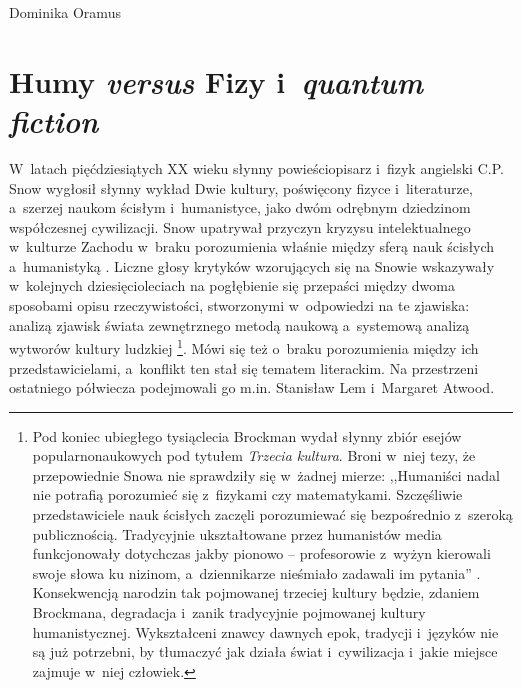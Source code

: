 \begin{artplenv}{Dominika Oramus}
\section*{Humy \textit{versus} Fizy i~\textit{quantum fiction}}
W~latach pięćdziesiątych XX wieku słynny powieściopisarz i~fizyk angielski C.P. Snow wygłosił słynny wykład Dwie kultury, poświęcony fizyce i~literaturze, a~szerzej naukom ścisłym i~humanistyce, jako dwóm odrębnym dziedzinom współczesnej cywilizacji. Snow upatrywał przyczyn kryzysu intelektualnego w~kulturze Zachodu w~braku porozumienia właśnie między sferą nauk ścisłych a~humanistyką
\parencite[][]{snow_dwie_1999}. %
 Liczne głosy krytyków wzorujących się na Snowie wskazywały w~kolejnych dziesięcioleciach na pogłębienie się przepaści między dwoma sposobami opisu rzeczywistości, stworzonymi w~odpowiedzi na te zjawiska: analizą zjawisk świata zewnętrznego metodą naukową a~systemową analizą wytworów kultury ludzkiej 
\parencite[zob. np.][]{weiner_postnaturalizm_2018}%
\footnote{Pod koniec ubiegłego tysiąclecia Brockman wydał słynny zbiór esejów popularnonaukowych pod tytułem \textit{Trzecia kultura}. Broni w~niej tezy, że przepowiednie Snowa nie sprawdziły się w~żadnej mierze: ,,Humaniści nadal nie potrafią porozumieć się z~fizykami czy matematykami. Szczęśliwie przedstawiciele nauk ścisłych zaczęli porozumiewać się bezpośrednio z~szeroką publicznością. Tradycyjnie ukształtowane przez humanistów media funkcjonowały dotychczas jakby pionowo -- profesorowie z~wyżyn kierowali swoje słowa ku nizinom, a~dziennikarze nieśmiało zadawali im pytania'' 
\parencite[][s.~17]{brockman_trzecia_1996}. %
 Konsekwencją narodzin tak pojmowanej trzeciej kultury będzie, zdaniem Brockmana, degradacja i~zanik tradycyjnie pojmowanej kultury humanistycznej. Wykształceni znawcy dawnych epok, tradycji i~języków nie są już potrzebni, by tłumaczyć jak działa świat i~cywilizacja i~jakie miejsce zajmuje w~niej człowiek.}. Mówi się też o~braku porozumienia między ich przedstawicielami, a~konflikt ten stał się tematem literackim. Na przestrzeni ostatniego półwiecza podejmowali go m.in. Stanisław Lem i~Margaret Atwood.


\end{artplenv}
